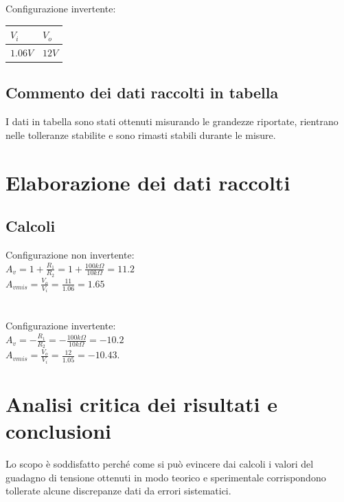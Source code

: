 \documentclass[12pt]{article}
\begin{document}
\noindent
Configurazione invertente:\\
\begin{center}
    \begin{tabular}{|p{2cm} |p{2cm}|}
        \hline
        \rowcolor{RoyalBlue} $V_i$ & $V_o$  \\
        \hline
        \rowcolor{CornflowerBlue} $1.06V$ & $12V$  \\ 
        \hline
    \end{tabular}
    \label{Valore resistenze}
\end{center}
\subsection{Commento dei dati raccolti in tabella}
I dati in tabella sono stati ottenuti misurando le grandezze riportate, rientrano nelle
tolleranze stabilite e sono rimasti stabili durante le misure.\\
\newpage
\section{Elaborazione dei dati raccolti}
\subsection{Calcoli}
Configurazione non invertente:\\
$A_v=1+\frac{R_1}{R_2}=1+\frac{100k\Omega}{10k\Omega}=11.2$\\
$A_{vmis}=\frac{V_o}{V_i}=\frac{11}{1.06}=1.65$\\
\\
\\
Configurazione invertente:\\
$A_v=-\frac{R_1}{R_2}=-\frac{100k\Omega}{10k\Omega}=-10.2$\\
$A_{vmis}=\frac{V_o}{V_i}=\frac{12}{1.05}=-10.43.$\\

\section{Analisi critica dei risultati e conclusioni}
Lo scopo è soddisfatto perché come si può evincere dai calcoli i valori del guadagno di tensione 
ottenuti in modo teorico e sperimentale corrispondono tollerate alcune discrepanze dati da errori
sistematici.\\
\end{document}
